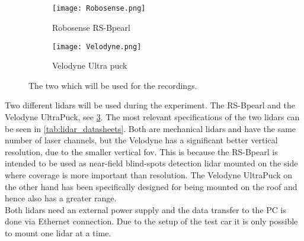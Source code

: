 \subsection{}
\begin{figure}[htbp]
	\centering
	\begin{subfigure}{0.4\textwidth}
		\centering
		\texttt{[image: Robosense.png]}
		\caption[The \glspl{lidar} used in the experiment]{Robosense RS-Bpearl \cite{RoboSense2020}}
		\label{fig:lidar_robosense}
	\end{subfigure}
	\begin{subfigure}{0.4\textwidth}
		\centering
		\texttt{[image: Velodyne.png]}
		\caption{Velodyne Ultra puck \cite{Velodyne2018}}
		\label{fig:lidar_velodyne}
	\end{subfigure}
	\caption{The two  which will be used for the recordings.}
	\label{fig:lidars_used}
\end{figure}
Two different \glspl{lidar} will be used during the experiment.
The RS-Bpearl and the Velodyne UltraPuck, see \cref{fig:lidars_used}.
The most relevant specifications of the two \glspl{lidar} can be seen in \cref{tab:lidar_datasheets}.
Both are mechanical \glspl{lidar} and have the same number of laser channels, but the Velodyne has a significant better vertical resolution, due to the smaller vertical \gls{fov}.
This is because the RS-Bpearl is intended to be used as near-field blind-spots detection \gls{lidar} mounted on the side where coverage is more important than resolution.
The Velodyne UltraPuck on the other hand has been specifically designed for being mounted on the roof and hence also has a greater range.\\
Both \glspl{lidar} need an external power supply and the data transfer to the PC is done via Ethernet connection.
Due to the setup of the test car it is only possible to mount one \gls{lidar} at a time.
